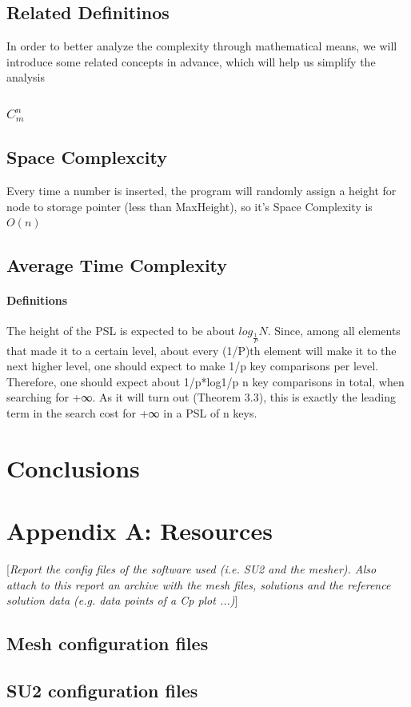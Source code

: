 \documentclass[10pt,english, openany]{book}
\begin{document}
\section{Related Definitinos}
In order to better analyze the complexity through mathematical means, we will introduce some related concepts in advance, which will help us simplify the analysis
\subsection{$C_m^n$}
\section{Space Complexcity}
Every time a number is inserted, the program will randomly assign a height for node to storage pointer (less than MaxHeight), so it’s Space Complexity is $O(n)$
\section{Average Time Complexity}
\subsubsection{Definitions}
The height of the PSL is expected to be about $log_{\frac{1}{P}}N$. Since, among all elements that made it to a certain level, about every (1/P)th element will make it to the next higher level, one should expect to make 1/p key comparisons per level. Therefore, one should expect about 1/p*log1/p n key comparisons in total, when searching for +∞. As it will turn out (Theorem 3.3), this is exactly the leading term in the search cost for +∞ in a PSL of n keys.
\chapter{Conclusions}

\pagebreak





\pagebreak

\chapter*{Appendix A: Resources}
[\textit{Report the config files of the software used (i.e. SU2 \cite{economon2015su2} and the mesher). Also attach to this report an archive with the mesh files, solutions and the reference solution data (e.g. data points of a Cp plot ...)}]
\section*{Mesh configuration files}
\section*{SU2 configuration files}
\end{document}
